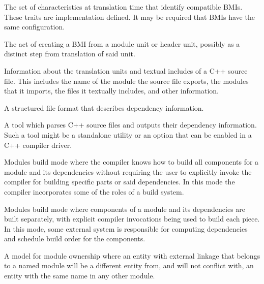 The set of characteristics at translation time that identify compatible BMIs.
These traits are implementation defined. It may be required that BMIs have the
same configuration.

The act of creating a BMI from a module unit or header unit, possibly as a
distinct step from translation of said unit.

Information about the translation units and textual includes of a C++ source
file. This includes the name of the module the source file exports, the modules
that it imports, the files it textually includes, and other information.

A structured file format that describes dependency information.

A tool which parses C++ source files and outputs their dependency information.
Such a tool might be a standalone utility or an option that can be enabled in a
C++ compiler driver.

Modules build mode where the compiler knows how to build all components for a
module and its dependencies without requiring the user to explicitly invoke the
compiler for building specific parts or said dependencies. In this mode the
compiler incorporates some of the roles of a build system.

Modules build mode where components of a module and its dependencies are built
separately, with explicit compiler invocations being used to build each piece.
In this mode, some external system is responsible for computing dependencies
and schedule build order for the components.

A model for module ownership where an entity with external linkage that belongs
to a named module will be a different entity from, and will not conflict with,
an entity with the same name in any other module.

